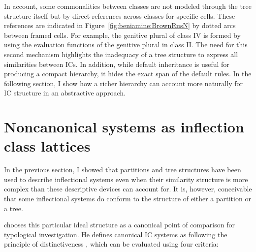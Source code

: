 \documentclass[output=paper]{langscibook}
\begin{document}
    In  account, some commonalities between classes are not modeled through the tree structure itself but by direct references across classes for specific cells. These references are indicated in Figure~\ref{fig:beniamine:BrownRusN} by dotted arcs between framed cells. For example, the genitive plural of class IV is formed by using the evaluation functions of the genitive plural in class II. The need for this second mechanism highlights the inadequacy of a tree structure to express all similarities between ICs. In addition, while default inheritance is useful for producing a compact hierarchy, it hides the exact span of the default rules. In the following section, I show how a richer hierarchy can account more naturally for IC structure in an abstractive approach.


    \FloatBarrier

    \section{Noncanonical systems as inflection class lattices}
    \label{Section:non-canonical-systems-as-inflectional-lattices}

    In the previous section, I showed that partitions and tree structures have been used to describe inflectional systems even when their similarity structure is more complex than these descriptive devices can account for. It is, however, conceivable that some inflectional systems do conform to the structure of either a partition or a tree.

    \citet{Corbett2009} chooses this particular ideal structure as a canonical point of comparison for typological investigation. He defines canonical IC systems as following the principle of distinctiveness \citep[3]{Corbett2009}, which can be evaluated using four criteria:
\end{document}
